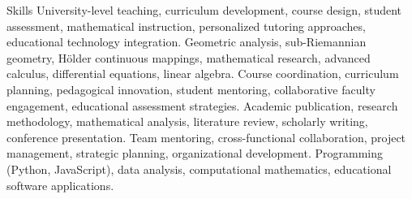 
\begin{rubric}{Skills}
\entry*[Education]
	University-level teaching, curriculum development, course design, student assessment, mathematical instruction, personalized tutoring approaches, educational technology integration.
\entry*[Mathematics]
	Geometric analysis, sub-Riemannian geometry, Hölder continuous mappings, mathematical research, advanced calculus, differential equations, linear algebra.
	Course coordination, curriculum planning, pedagogical innovation, student mentoring, collaborative faculty engagement, educational assessment strategies.
\entry*[Research]
	Academic publication, research methodology, mathematical analysis, literature review, scholarly writing, conference presentation.
\entry*[Leadership]
	Team mentoring, cross-functional collaboration, project management, strategic planning, organizational development.
	Programming (Python, JavaScript), data analysis, computational mathematics, educational software applications.
\end{rubric}
